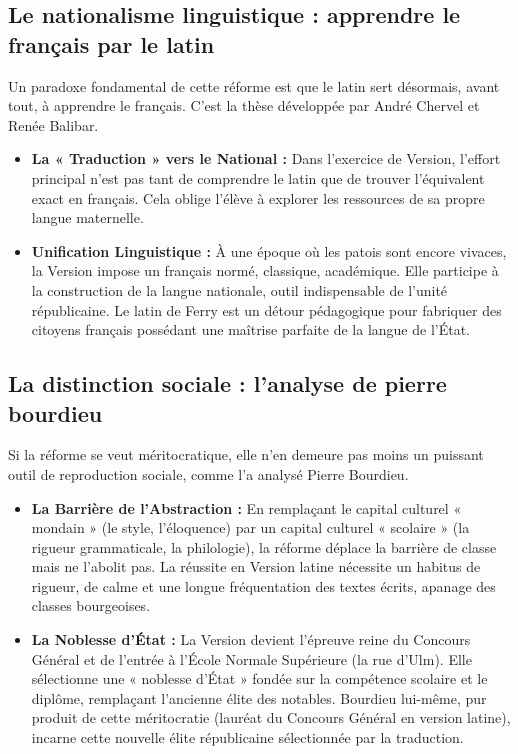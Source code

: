 \subsection{Le nationalisme linguistique : apprendre le français par le latin}

Un paradoxe fondamental de cette réforme est que le latin sert désormais, avant tout, à apprendre le
français. C'est la thèse développée par André Chervel et Renée Balibar.

\begin{itemize}\item \textbf{La « Traduction » vers le National :} Dans l'exercice de Version, l'effort principal n'est pas tant de comprendre le latin que de trouver l'équivalent exact en français. Cela oblige l'élève à explorer les ressources de sa propre langue maternelle.\item \textbf{Unification Linguistique :} À une époque où les patois sont encore vivaces, la Version impose un français normé, classique, académique. Elle participe à la construction de la langue nationale, outil indispensable de l'unité républicaine. Le latin de Ferry est un détour pédagogique pour fabriquer des citoyens français possédant une maîtrise parfaite de la langue de l'État.\cite{I-1-2-ref1}\end{itemize}

\subsection{La distinction sociale : l'analyse de pierre bourdieu}

Si la réforme se veut méritocratique, elle n'en demeure pas moins un puissant outil de reproduction
sociale, comme l'a analysé Pierre Bourdieu.

\begin{itemize}\item \textbf{La Barrière de l'Abstraction :} En remplaçant le capital culturel « mondain » (le style, l'éloquence) par un capital culturel « scolaire » (la rigueur grammaticale, la philologie), la réforme déplace la barrière de classe mais ne l'abolit pas. La réussite en Version latine nécessite un habitus de rigueur, de calme et une longue fréquentation des textes écrits, apanage des classes bourgeoises.\cite{I-1-2-ref33}\item \textbf{La Noblesse d'État :} La Version devient l'épreuve reine du Concours Général et de l'entrée à l'École Normale Supérieure (la rue d'Ulm). Elle sélectionne une « noblesse d'État » fondée sur la compétence scolaire et le diplôme, remplaçant l'ancienne élite des notables. Bourdieu lui-même, pur produit de cette méritocratie (lauréat du Concours Général en version latine), incarne cette nouvelle élite républicaine sélectionnée par la traduction.\cite{I-1-2-ref35}\end{itemize}

